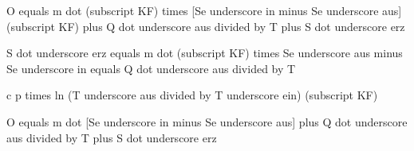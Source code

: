 O equals m dot (subscript KF) times [Se underscore in minus Se underscore aus] (subscript KF) plus Q dot underscore aus divided by T plus S dot underscore erz

S dot underscore erz equals m dot (subscript KF) times Se underscore aus minus Se underscore in equals Q dot underscore aus divided by T

c p times ln (T underscore aus divided by T underscore ein) (subscript KF)

O equals m dot [Se underscore in minus Se underscore aus] plus Q dot underscore aus divided by T plus S dot underscore erz